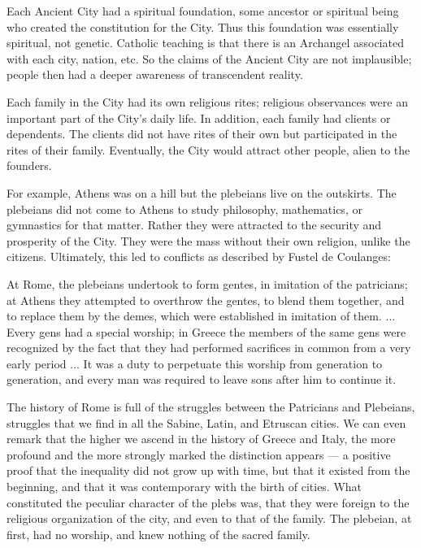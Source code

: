 Each Ancient City had a spiritual foundation, some ancestor or spiritual being who created the constitution for the City. Thus this foundation was essentially spiritual, not genetic. Catholic teaching is that there is an Archangel associated with each city, nation, etc. So the claims of the Ancient City are not implausible; people then had a deeper awareness of transcendent reality.

Each family in the City had its own religious rites; religious observances were an important part of the City's daily life. In addition, each family had clients or dependents. The clients did not have rites of their own but participated in the rites of their family. Eventually, the City would attract other people, alien to the founders.

For example, Athens was on a hill but the plebeians live on the outskirts. The plebeians did not come to Athens to study philosophy, mathematics, or gymnastics for that matter. Rather they were attracted to the security and prosperity of the City. They were the mass without their own religion, unlike the citizens. Ultimately, this led to conflicts as described by Fustel de Coulanges:

\begin{quotationx}
At Rome, the plebeians undertook to form gentes, in imitation of the patricians; at Athens they attempted to overthrow the gentes, to blend them together, and to replace them by the demes, which were established in imitation of them. ... Every gens had a special worship; in Greece the members of the same gens were recognized by the fact that they had performed sacrifices in common from a very early period ... It was a duty to perpetuate this worship from generation to generation, and every man was required to leave sons after him to continue it.

The history of Rome is full of the struggles between the Patricians and Plebeians, struggles that we find in all the Sabine, Latin, and Etruscan cities. We can even remark that the higher we ascend in the history of Greece and Italy, the more profound and the more strongly marked the distinction appears --- a positive proof that the inequality did not grow up with time, but that it existed from the beginning, and that it was contemporary with the birth of cities. What constituted the peculiar character of the plebs was, that they were foreign to the religious organization of the city, and even to that of the family. The plebeian, at first, had no worship, and knew nothing of the sacred family.
\end{quotationx}


